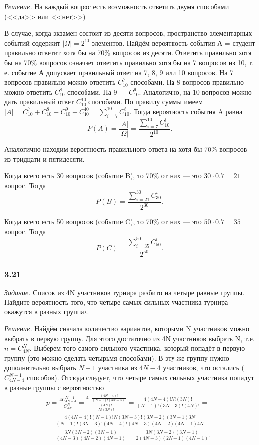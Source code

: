 \documentclass{book}
\begin{document}
\textit{Решение.} На каждый вопрос есть возможность ответить двумя способами (<<да>> или <<нет>>).

В случае, когда экзамен состоит из десяти вопросов, пространство элементарных событий содержит $ | \Omega | = 2^{10} $ элементов.
Найдём вероятность события А = {студент правильно ответит хотя бы на 70\% вопросов из десяти}.
Ответить правильно хотя бы на 70\% вопросов означает ответить правильно хотя бы на 7 вопросов из 10, т. е. событие А допускает правильный ответ на 7, 8, 9 или 10 вопросов.
На 7 вопросов правильно можно ответить $ C_{10}^7 $ способами.
На 8 вопросов правильно можно ответить $ C_{10}^8 $ способами.
На 9 --- $ C_{10}^9 $.
Аналогично, на 10 вопросов можно дать правильный ответ $ C_{10}^{10} $ способами.
По правилу суммы имеем $ |A| = C_{10}^7 + C_{10}^8 + C_{10}^9 + C_{10}^{10} = \sum \limits_{i=7}^{10} C_{10}^i $.
Тогда вероятность события A равна
$$ P \left( A \right) =
\frac{|A|}{| \Omega |} =
\frac{ \sum \limits_{i=7}^{10} C_{10}^i}{2^{10}}.$$

Аналогично находим вероятность правильного ответа на хотя бы 70\% вопросов из тридцати и пятидесяти.

Когда всего есть 30 вопросов (событие B), то 70\% от них --- это $ 30 \cdot 0.7 = 21$ вопрос.
Тогда
$$ P \left( B \right) =
\frac{ \sum \limits_{i=21}^{30} C_{30}^i}{2^{30}}.$$

Когда всего есть 50 вопросов (событие C), то 70\% от них --- это $ 50 \cdot 0.7 = 35$ вопрос.
Тогда
$$ P \left( C \right) =
\frac{ \sum \limits_{i=35}^{50} C_{50}^i}{2^{50}}.$$

\subsubsection*{3.21}

\textit{Задание.} Список из 4N участников турнира разбито на четыре равные группы.
Найдите вероятность того, что четыре самых сильных участника турнира окажутся в разных группах. 

\textit{Решение.} Найдём сначала количество вариантов, которыми N участников можно выбрать в первую группу.
Для этого достаточно из 4N участников выбрать N, т.е. $ n = C_{4N}^N $.
Выберем того самого сильного участника, который попадёт в первую группу (это можно сделать четырьмя способами).
В эту же группу нужно дополнительно выбрать $ N - 1 $ участника из $ 4N - 4 $ участников, что остались ($ C_{ 4N - 4 }^{ N - 1 } $ способов).
Отсюда следует, что четыре самых сильных участника попадут в разные группы с вероятностью
\begin{equation*}
\begin{split}
p =
\frac{ 4C_{ 4N - 4 }^{ N - 1 } }{ C_{ 4N }^N } =
\frac{ 4 \cdot \frac{ (4N-4)! }{ ( N - 1 )!( 3 N - 3)! } }{ \frac{ (4N)! }{ N!(3N)! } } =
\frac{ 4(4N-4)!N!(3N)! }{ (N-1)!(3N-3)!(4N)! } = \\
= \frac{ 4(4N-4)!(N-1)!N(3N-3)!(3N-2)(3N-1)3N }{ (N-1)!(3N-3)!(4N-4)!(4N-3)(4N-2)(4N-1)4N } = \\
= \frac{ 3N(3N-2)(3N-1) }{ (4N-3)(4N-2)(4N-1) } =
\frac{ 3N(3N-2)(3N-1) }{ 2(4N-3)(2N-1)(4N-1) }.
\end{split}
\end{equation*}
\end{document}
